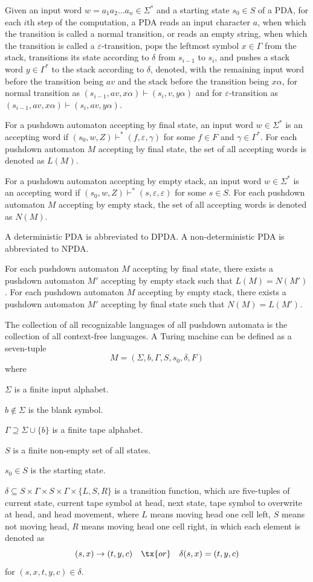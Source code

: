 \documentclass[a4paper,12pt]{article}
\begin{document}
Given an input word $w=a_1a_2\ldots a_n\in\Sigma^*$ and a starting state $s_0\in S$ of a PDA, for each $i$th step of the computation, a PDA reads an input character $a$, when which the transition is called a normal transition, or reads an empty string, when which the transition is called a $\varepsilon$-transition, pops the leftmost symbol $x\in\Gamma$ from the stack, transitions its state according to $\delta$ from $s_{i-1}$ to $s_i$, and pushes a stack word $y\in\Gamma^*$ to the stack according to $\delta$, denoted, with the remaining input word before the transition being $av$ and the stack before the transition being $x\alpha$, for normal transition as $(s_{i-1},av,x\alpha)\vdash(s_i,v,y\alpha)$ and for $\varepsilon$-transition as $(s_{i-1},av,x\alpha)\vdash(s_i,av,y\alpha)$.

For a pushdown automaton accepting by final state, an input word $w\in\Sigma^*$ is an accepting word if $(s_0,w,Z)\vdash^*(f,\varepsilon,\gamma)$ for some $f\in F$ and $\gamma\in\Gamma^*$. For each pushdown automaton $M$ accepting by final state, the set of all accepting words is denoted as $L(M)$.

For a pushdown automaton accepting by empty stack, an input word $w\in\Sigma^*$ is an accepting word if $(s_0,w,Z)\vdash^*(s,\varepsilon,\varepsilon)$ for some $s\in S$. For each pushdown automaton $M$ accepting by empty stack, the set of all accepting words is denoted as $N(M)$.

A deterministic PDA is abbreviated to DPDA. A non-deterministic PDA is abbreviated to NPDA.

 For each pushdown automaton $M$ accepting by final state, there exists a pushdown automaton $M'$ accepting by empty stack such that $L(M)=N(M')$. For each pushdown automaton $M$ accepting by empty stack, there exists a pushdown automaton $M'$ accepting by final state such that $N(M)=L(M')$.

 The collection of all recognizable languages of all pushdown automata is the collection of all context-free languages.
A Turing machine can be defined as a seven-tuple
\[M=(\Sigma,b,\Gamma,S,s_0,\delta,F)\]
where
\bit
\item $\Sigma$ is a finite input alphabet.
\item $b\notin\Sigma$ is the blank symbol.
\item $\Gamma\supseteq\Sigma\cup\{b\}$ is a finite tape alphabet.
\item $S$ is a finite non-empty set of all states.
\item $s_0\in S$ is the starting state.
\item $\delta\subseteq S\times\Gamma\times S\times\Gamma\times\{L,S,R\}$ is a transition function, which are five-tuples of current state, current tape symbol at head, next state, tape symbol to overwrite at head, and head movement, where $L$ means moving head one cell left, $S$ means not moving head, $R$ means moving head one cell right, in which each element is denoted as
\[(s,x)\to (t,y,c)\quad\tx{or}\quad\delta(s,x)=(t,y,c)\]
for $(s,x,t,y,c)\in\delta$.
\end{document}

